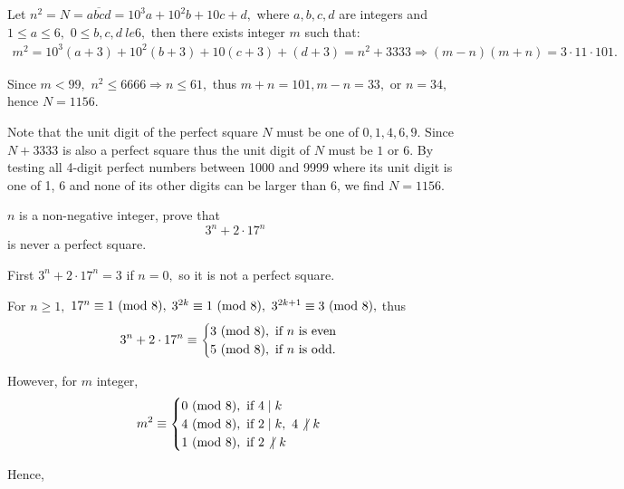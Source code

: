 \documentclass{article}
\begin{document}
\begin{soln}[Solution 1]
    Let $n^2 = N = \overline{abcd} = 10^3a + 10^2b + 10c + d,$ where $a,b,c,d$ are integers and $1\le a \le 6,$ $0\le b,c,d \ le 6,$
    then there exists integer $m$ such that:
    \[
        \begin{aligned}
            m^2 = 10^3 (a+3) + 10^2 (b+3) + 10(c+3) + (d+3) = n^2 + 3333 \Rightarrow (m-n)(m+n) = 3 \cdot 11 \cdot 101.
        \end{aligned}
    \]

    Since $m < 99,$ $n^2 \le 6666 \Rightarrow n \le 61,$ thus $m+n=101, m-n=33,$ or $n=34,$ hence $\boxed{N=1156.}$
\end{soln}

\begin{soln}[Solution 2]
    Note that the unit digit of the perfect square $N$ must be one of $0,1,4,6,9.$
    Since $N+3333$ is also a perfect square thus the unit digit of $N$ must be $1$ or $6$.
    By testing all 4-digit perfect numbers between 1000 and 9999 where its unit digit is one of 1, 6
    and none of its other digits can be larger than 6, we find $\boxed{N=1156.}$
\end{soln}

\begin{example*}[Example 15]
    $n$ is a non-negative integer, prove that
    \[
        3^n + 2\cdot 17^n
    \]
    is never a perfect square.
\end{example*}

\begin{soln}[Solution 1]
    First $3^n + 2\cdot 17^n = 3$ if $n=0,$ so it is not a perfect square.
    
    For $n \ge 1,$ $17^n \equiv 1 \ (\mathrm{mod}\ 8),$ $3^{2k} \equiv 1 \ (\mathrm{mod}\ 8),$ $3^{2k+1} \equiv 3 \ (\mathrm{mod}\ 8),$ thus
    \[
        3^n + 2\cdot 17^n \equiv
        \begin{cases}
            3 \ (\mathrm{mod}\ 8), \text{\ if\ } n \text{\ is even}\\
            5 \ (\mathrm{mod}\ 8), \text{\ if\ } n \text{\ is odd.}\\
        \end{cases}
    \]
    
    However, for $m$ integer,
    \[
        m^2 \equiv
        \begin{cases}
            0 \ (\mathrm{mod}\ 8), \text{\ if\ } 4 \mid k\\
            4 \ (\mathrm{mod}\ 8), \text{\ if\ } 2 \mid k,\ 4 \not |\ k\\
            1 \ (\mathrm{mod}\ 8), \text{\ if\ } 2 \not |\ k\\
        \end{cases}
    \]

    Hence, 
\end{soln}
\end{document}
